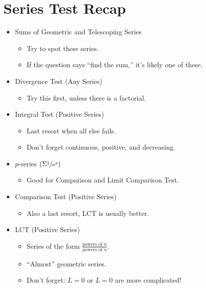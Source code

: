 \section*{Series Test Recap}
\begin{itemize}
    \item Sums of Geometric and Telescoping Series
          \begin{itemize}
              \item Try to spot these series.
              \item If the question says ``find the sum,'' it's likely one of these.
          \end{itemize}
    \item Divergence Test (Any Series)
          \begin{itemize}
              \item Try this first, unless there is a factorial.
          \end{itemize}
    \item Integral Test (Positive Series)
          \begin{itemize}
              \item Last resort when all else fails.
              \item Don't forget continuous, positive, and decreasing.
          \end{itemize}
    \item $ p $-series $ \left( \Sigma \sfrac{1}{n^p} \right) $
          \begin{itemize}
              \item Good for Comparison and Limit Comparison Test.
          \end{itemize}
    \item Comparison Test (Positive Series)
          \begin{itemize}
              \item Also a last resort, LCT is usually better.
          \end{itemize}
    \item LCT (Positive Series)
          \begin{itemize}
              \item Series of the form $ \frac{\text{powers of }n}{\text{powers of }n} $.
              \item ``Almost'' geometric series.
              \item Don't forget: $ L=0 $ or $ L=0 $ are more complicated!
          \end{itemize}

\end{itemize}
